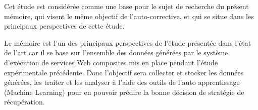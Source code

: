 Cet étude est considérée comme une base pour le sujet de recherche du présent mémoire, qui visent le même objectif de l'auto-corrective, et qui se situe dans les principaux perspectives de cette étude.

Le mémoire est l'un des principaux perspectives de l'étude présentée dans l'état de l'art car il se base sur l'ensemble des données générées par le système d'exécution de services Web composites mis en place pendant l'étude expérimentale précédente. Donc l'objectif sera collecter et stocker les données générées, les traiter et les analyser à l'aide des outils de l'auto apprentissage (Machine Learning) pour en pouvoir prédire la bonne décision de stratégie de récupération.




